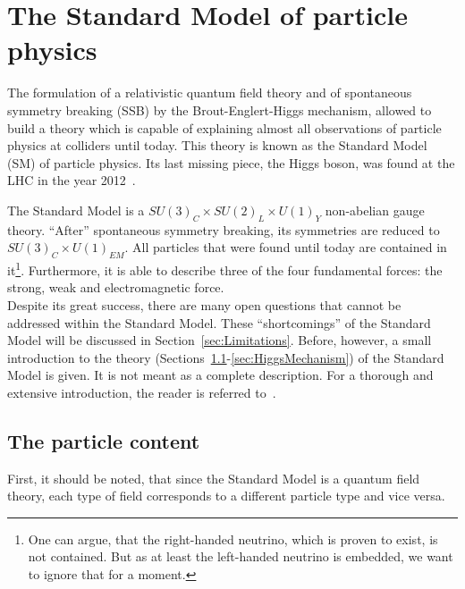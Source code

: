 \chapter{The Standard Model of particle physics}

The formulation of a relativistic quantum field theory and of spontaneous symmetry breaking (SSB) by the Brout-Englert-Higgs mechanism, allowed to build a theory which is capable of explaining almost all observations of particle physics at colliders until today. %
This theory is known as the Standard Model (SM) of particle physics.
Its last missing piece, the Higgs boson, was found at the LHC in the year 2012~\cite{bib:Theory:CMS:HiggsObservation,bib:Theory:Atlas:HiggsObservation}.

The Standard Model is a $SU(3)_C  \times SU(2)_L \times U(1)_Y$ non-abelian gauge theory.
``After'' spontaneous symmetry breaking, its symmetries are reduced to $SU(3)_C \times U(1)_{EM}$.
All particles that were found until today are contained in it\footnote{One can argue, that the right-handed neutrino, which is proven to exist, is not contained. But as at least the left-handed neutrino is embedded, we want to ignore that for a moment.}.
Furthermore, it is able to describe three of the four fundamental forces: the strong, weak and electromagnetic force.\\

Despite its great success, there are many open questions that cannot be addressed within the Standard Model.
These ``shortcomings'' of the Standard Model will be discussed in Section~\ref{sec:Limitations}.
Before, however, a small introduction to the theory (Sections~\ref{sec:ParticleContent_SM}-\ref{sec:HiggsMechanism}) of the Standard Model is given.
It is not meant as a complete description.
For a thorough and extensive introduction, the reader is referred to~\cite{bib:SM_book_Peskin,bib:SM_book_Ryder,bib:SM_book_Griffiths}. 

\section{The particle content}
\label{sec:ParticleContent_SM}
First, it should be noted, that since the Standard Model is a quantum field theory, each type of field corresponds to a different particle type and vice versa.


